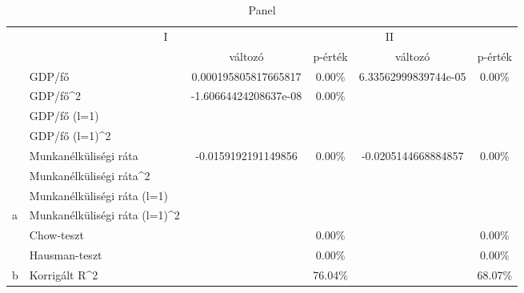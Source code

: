 \documentclass[
]{article}
\begin{document}
\begin{landscape}\begin{table}

\caption{\label{tab:unnamed-chunk-18}Panel}
\centering
\begin{tabular}[t]{l|l|c|c|c|c}
\hline
\multicolumn{1}{c|}{ } & \multicolumn{2}{c|}{I} & \multicolumn{2}{c}{II} \\
\cline{2-3} \cline{4-5}
 &  & változó & p-érték & változó & p-érték\\
\hline
 & GDP/fő & 0.000195805817665817 & 0.00\% & 6.33562999839744e-05 & 0.00\%\\
\cline{2-6}
 & GDP/fő\textasciicircum{}2 & -1.60664424208637e-08 & 0.00\% &  & \\
\cline{2-6}
 & GDP/fő (l=1) &  &  &  & \\
\cline{2-6}
 & GDP/fő (l=1)\textasciicircum{}2 &  &  &  & \\
\cline{2-6}
 & Munkanélküliségi ráta & -0.0159192191149856 & 0.00\% & -0.0205144668884857 & 0.00\%\\
\cline{2-6}
 & Munkanélküliségi ráta\textasciicircum{}2 &  &  &  & \\
\cline{2-6}
 & Munkanélküliségi ráta (l=1) &  &  &  & \\
\cline{2-6}
\multirow[t]{-8}{*}{\raggedright\arraybackslash a} & Munkanélküliségi ráta (l=1)\textasciicircum{}2 &  &  &  & \\
\cline{1-6}
 & Chow-teszt &  & 0.00\% &  & 0.00\%\\
\cline{2-6}
 & Hausman-teszt &  & 0.00\% &  & 0.00\%\\
\cline{2-6}
\multirow[t]{-3}{*}{\raggedright\arraybackslash b} & Korrigált R\textasciicircum{}2 &  & 76.04\% &  & 68.07\%\\
\hline
\end{tabular}
\end{table}
\end{landscape}
\end{document}
